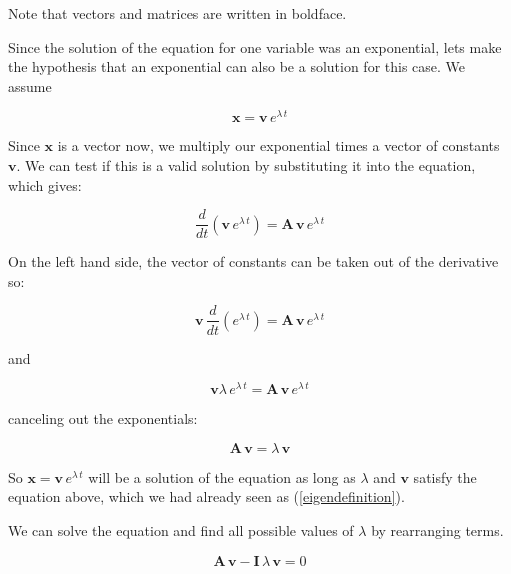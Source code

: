 \documentclass[12pt]{article}
\begin{document}
Note that vectors and matrices are written in boldface.

Since the solution of the equation for one variable was an exponential, lets make the hypothesis that an exponential can also be a solution for this case. We assume

\begin{equation}
	\mathbf{x}= \mathbf{v} \, e^{\lambda \, t} \nonumber
\end{equation}

Since $\mathbf{x}$ is a vector now, we multiply our exponential times a  vector of constants $\mathbf{v}$. We can test if this is a valid solution by substituting it into the equation, which gives:

\begin{equation}
	\frac{d}{dt} \left( \mathbf{v} \, e^{\lambda \, t} \right)  = \mathbf{A} \, \mathbf{v} \, e^{\lambda \, t}  \nonumber
\end{equation}

On the left hand side, the vector of  constants can be taken out of the derivative so:

\begin{equation}
	\mathbf{v} \, \frac{d}{dt} \left(  e^{\lambda \, t} \right)  = \mathbf{A} \, \mathbf{v} \, e^{\lambda \, t}  \nonumber
\end{equation}
 
 and
 
 \begin{equation}
 	\mathbf{v}   \lambda \, e^{\lambda \, t}   = \mathbf{A} \, \mathbf{v} \, e^{\lambda \, t} \nonumber
 \end{equation}
 
canceling out the exponentials:

\begin{equation}
\mathbf{A} \, \mathbf{v}  = \lambda  \,	\mathbf{v}   
\end{equation}
 
So $\mathbf{x}=\mathbf{v} \, e^{\lambda \, t}$ will be a solution of the equation as long as $\lambda$ and $\mathbf{v}$ satisfy the equation above, which we had already seen as (\ref{eigendefinition}).

We can solve the equation and find all possible values of $\lambda$ by rearranging terms.

\begin{equation}
	\mathbf{A} \, \mathbf{v}  - \mathbf{I} \, \lambda  \,	\mathbf{v}   = 0 \nonumber
\end{equation}
\end{document}
